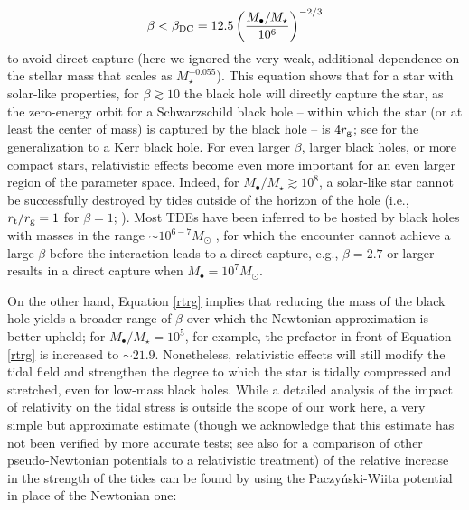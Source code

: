 \documentclass[twocolumn]{aastex62}
\begin{document}
\begin{equation}
\beta < \beta_{\rm DC} = 12.5\left(\frac{M_{\bullet}/M_{\star}}{10^{6}}\right)^{-2/3} \label{betaeq}
\end{equation}
to avoid direct capture (here we ignored the very weak, additional dependence on the stellar mass that scales as $M_{\star}^{-0.055}$). This equation shows that for a star with solar-like properties, for $\beta  \gtrsim 10$ the black hole will directly capture the star, as the zero-energy orbit for a Schwarzschild black hole -- within which the star (or at least the center of mass) is captured by the black hole -- is $4 r_{\rm g}$; see \citealt{kesden12} for the generalization to a Kerr black hole. For even larger $\beta$, larger black holes, or more compact stars, relativistic effects become even more important for an even larger region of the parameter space.
Indeed, for $M_{\bullet}/M_{\star} \gtrsim 10^{8}$, a solar-like star cannot be successfully destroyed by tides outside of the horizon of the hole (i.e., $r_{\rm t}/r_{\rm g} = 1$ for $\beta = 1$; \citealt{kesden12, stone19}). Most TDEs have been inferred to be hosted by black holes with masses in the range $\sim 10^{6-7}M_{\odot}$ \citep{mockler19}, for which the encounter cannot achieve a large $\beta$ before the interaction leads to a direct capture, e.g., $\beta = 2.7$ or larger results in a direct capture when $M_{\bullet} = 10^{7} M_{\odot}$. 

On the other hand, Equation \eqref{rtrg} implies that reducing the mass of the black hole yields a broader range of $\beta$ over which the Newtonian approximation is better upheld; for $M_{\bullet}/M_{\star} = 10^{5}$, for example, the prefactor in front of Equation \eqref{rtrg} is increased to $\sim 21.9$. Nonetheless, relativistic effects will still modify the tidal field and strengthen the degree to which the star is tidally compressed and stretched, even for low-mass black holes. While a detailed analysis of the impact of relativity on the tidal stress is outside the scope of our work here, a very simple but approximate estimate (though we acknowledge that this estimate has not been verified by more accurate tests; see also \citealt{tejeda13} for a comparison of other pseudo-Newtonian potentials to a relativistic treatment) of the relative increase in the strength of the tides can be found by using the Paczy\'nski-Wiita potential \citep{paczynski80} in place of the Newtonian one:
\end{document}
